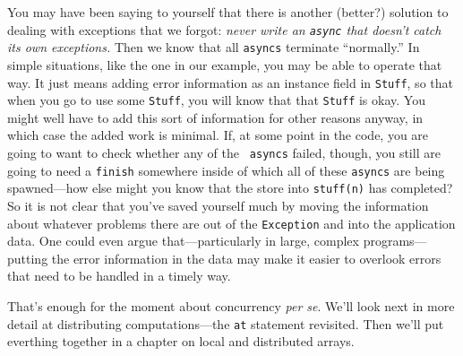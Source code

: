 You may have been saying to yourself that there is another (better?) solution to
dealing with exceptions that we forgot: {\em never write an {\tt async} that
doesn't catch its own exceptions.}  Then we know that all {\tt asyncs} terminate
``normally.''  In simple situations, like the one in our example, you may be
able to operate that way.  It just means adding error information as an instance
field in {\tt Stuff}, so that when you go to use some {\tt Stuff}, you will know
that that {\tt Stuff} is okay. You might well have to add this sort of information
for other reasons anyway, in which case the added work is minimal. If, at some
point in the code, you are going to want to check whether any of the {\tt
asyncs} failed, though, you still are going to need a {\tt finish} somewhere
inside of which all of these {\tt asyncs} are being spawned---how else might
you know that the store into {\tt stuff(n)} has completed?  So it is not clear
that you've saved yourself much by moving the information about whatever
problems there are out of the {\tt Exception} and into the application data.
One could even argue that---particularly in large, complex programs---putting
the error information in the data may make it easier to overlook errors that
need to be handled in a timely way.

That's enough for the moment about concurrency {\em per se}.  We'll look next in
more detail at distributing computations---the {\tt at} statement revisited. 
Then we'll put everthing together in a chapter on local and distributed arrays.


